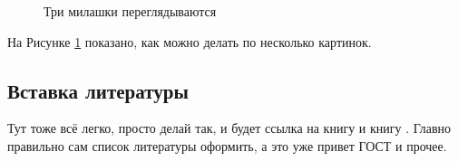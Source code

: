 \documentclass[a4paper, 12pt]{article}
\begin{document}
\begin{figure}[h]
    \begin{minipage}[h]{0.5\linewidth}
    \end{minipage}
    \begin{minipage}[h]{0.5\linewidth}
    \end{minipage}
    \caption{\label{img_cute}Три милашки переглядываются}
\end{figure}

На Рисунке \ref{img_cute} показано, как можно делать по несколько картинок.

\subsection{Вставка литературы}
Тут тоже всё легко, просто делай так, и будет ссылка на книгу \cite{book1} и книгу \cite{book2}.
Главно правильно сам список литературы оформить, а это уже привет ГОСТ и прочее.
\end{document}

